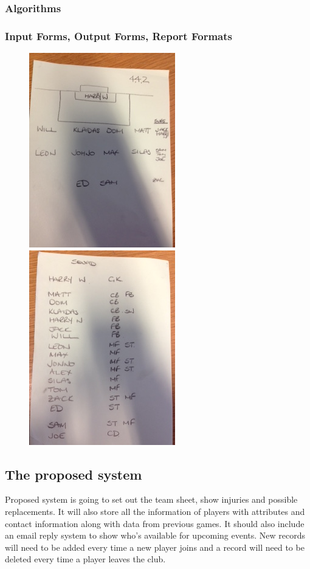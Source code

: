 \subsubsection{Algorithms}



\subsubsection{Input Forms, Output Forms, Report Formats}
\begin{figure}[H]
	\includegraphics{formation}
	\includegraphics{squad}
\end{figure}

\subsection{The proposed system}
Proposed system is going to set out the team sheet, show injuries and possible replacements. It will also store all the information of players with attributes and contact information along with data from previous games. It should also include an email reply system to show who's available for upcoming events. New records will need to be added every time a new player joins and a record will need to be deleted every time a player leaves the club.

